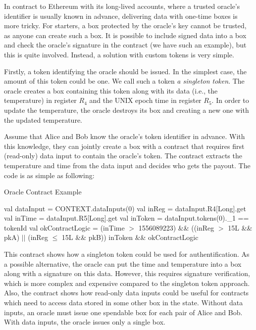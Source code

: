  In contract to Ethereum with its long-lived accounts, where a trusted oracle's identifier is usually known in advance, delivering data with one-time boxes is more tricky. For starters, a box protected by the oracle's key cannot be trusted, as anyone can create such a box. It is possible to include signed data into a box and check the oracle's signature in the contract (we have such an example), but this is quite involved. Instead, a solution with custom
 tokens is very simple.

 Firstly, a token identifying the oracle should be issued. In the simplest case, the amount of this token could be one. We call such a token {\em a singleton token}. The oracle creates a box containing this token along with its data (i.e., the temperature) in register $R_4$ and the UNIX epoch time in register $R_5$.
 In order to update the temperature, the oracle destroys its box and creating a new one with the updated temperature.

 Assume that Alice and Bob know the oracle's token identifier in advance. With this knowledge, they can jointly create a box with a contract that requires first (read-only) data input to contain the oracle's token. The contract extracts the temperature and time from the data input
 and decides who gets the payout. The code is as simple as following:

 \begin{algorithm}[H]
    \caption{Oracle Contract Example}
    \label{alg:oracle}
    \begin{algorithmic}[1]
        \State val dataInput = CONTEXT.dataInputs(0)
        \State val inReg = dataInput.R4[Long].get
        \State val inTime = dataInput.R5[Long].get
        \State val inToken = dataInput.tokens(0).\_1 == tokenId
        \State val okContractLogic = (inTime $>$ 1556089223) \&\&
        \State\hspace{\algorithmicindent}\hspace{\algorithmicindent} ((inReg $>$ 15L \&\& pkA) $||$ (inReg $\le$ 15L \&\& pkB))
        \State inToken \&\& okContractLogic
    \end{algorithmic}
 \end{algorithm}

 This contract shows how a singleton token could be used for authentification. As a possible alternative, the oracle
 can put the time and temperature into a box along with a signature on this data. However, this requires signature verification, which is more complex and expensive compared to
 the singleton token approach. Also, the contract shows how read-only data inputs could be useful for contracts which need to access data stored in some other box in the state. Without data inputs, an oracle must issue one spendable box for each
 pair of Alice and Bob. With data inputs, the oracle issues only a single box.

